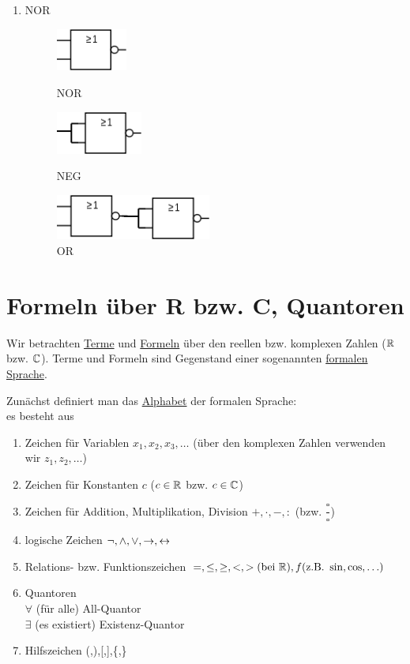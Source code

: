 \begin{enumerate}
	\item NOR
	\begin{figure}[h!]
		\begin{minipage}{0.32\linewidth}
			\centering \includegraphics[height=1.4cm]{Bilder/47}
			\caption{NOR}
		\end{minipage}
		\begin{minipage}{0.32\linewidth}
			\centering \includegraphics[height=1.4cm]{Bilder/75}
			\caption{NEG}
		\end{minipage}
		\begin{minipage}{0.32\linewidth}
			\centering \includegraphics[height=1.5cm]{Bilder/74}
			\caption{OR}
		\end{minipage}
	\end{figure}
\end{enumerate}

\clearpage
\section{Formeln über R bzw. C, Quantoren}
Wir betrachten \ul{Terme} und \ul{Formeln} über den reellen bzw. komplexen Zahlen ($\mathbb{R}$ bzw. $\mathbb{C}$). Terme und Formeln sind Gegenstand einer sogenannten \ul{formalen Sprache}.\hfill{}

Zunächst definiert man das \ul{Alphabet} der formalen Sprache:\\
es besteht aus
\begin{enumerate}
	\item Zeichen für Variablen $x_1,x_2,x_3,\ldots$ (über den komplexen Zahlen verwenden wir $z_1,z_2,\ldots$)
	\item Zeichen für Konstanten $c$ ($c\in\mathbb{R}$ bzw. $c\in\mathbb{C}$)
	\item Zeichen für Addition, Multiplikation, Division $+,\cdot,-,:$ (bzw. $\dfrac{\square}{\square}$)
	\item logische Zeichen $\neg, \land,\lor,\rightarrow,\leftrightarrow$
	\item Relations- bzw. Funktionszeichen $=,\le,\ge,<,> (\text{bei }\mathbb{R}), f(\text{z.B. }\sin, \cos,\ldots)$
	\item Quantoren\\
	$\forall$ (für alle) All-Quantor\\
	$\exists$ (es existiert) Existenz-Quantor
	\item Hilfszeichen (,),[,],\{,\}
\end{enumerate}

